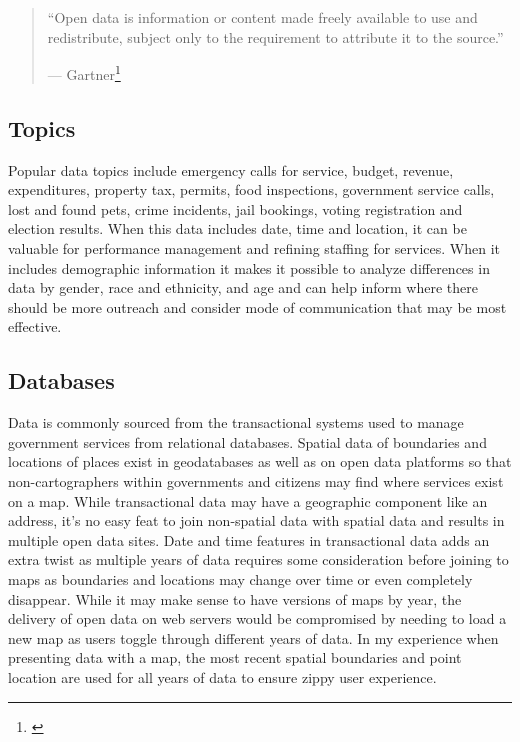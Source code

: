 \documentclass[
]{book}
\begin{document}
\begin{quote}
``Open data is information or content made freely available to use and redistribute, subject only to the requirement to attribute it to the source.''

--- Gartner\footnote{\citet{gartner_opendata_def}}
\end{quote}

\hypertarget{topics}{%
\subsection{Topics}\label{topics}}

Popular data topics include emergency calls for service, budget, revenue, expenditures, property tax, permits, food inspections, government service calls, lost and found pets, crime incidents, jail bookings, voting registration and election results. When this data includes date, time and location, it can be valuable for performance management and refining staffing for services. When it includes demographic information it makes it possible to analyze differences in data by gender, race and ethnicity, and age and can help inform where there should be more outreach and consider mode of communication that may be most effective.

\hypertarget{databases}{%
\subsection{Databases}\label{databases}}

Data is commonly sourced from the transactional systems used to manage government services from relational databases.
Spatial data of boundaries and locations of places exist in geodatabases as well as on open data platforms so that non-cartographers within governments and citizens may find where services exist on a map. While transactional data may have a geographic component like an address, it's no easy feat to join non-spatial data with spatial data and results in multiple open data sites. Date and time features in transactional data adds an extra twist as multiple years of data requires some consideration before joining to maps as boundaries and locations may change over time or even completely disappear. While it may make sense to have versions of maps by year, the delivery of open data on web servers would be compromised by needing to load a new map as users toggle through different years of data. In my experience when presenting data with a map, the most recent spatial boundaries and point location are used for all years of data to ensure zippy user experience.
\end{document}
